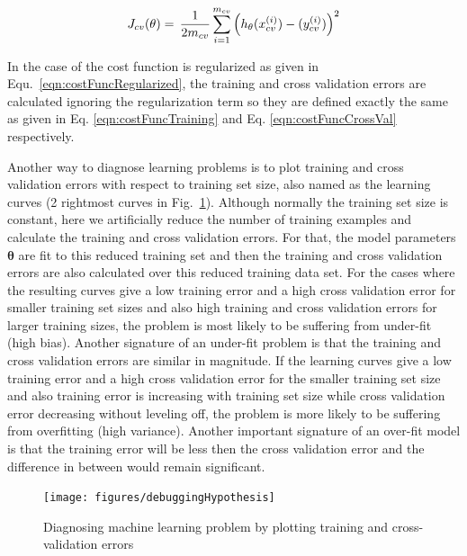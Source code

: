 \begin{equation}{\label{eqn:crossvalError}}
J_{cv}(\theta)
=\,
\frac{1}{2m_{cv}} \sum\limits_{i=1}^{m_{cv}} \Big(h_\theta(x_{cv}^{(i)}) - (y_{cv}^{(i)})\Big)^2  
\end{equation} 
\fi

In the case of the cost function is regularized as given in Equ.~\ref{eqn:costFuncRegularized}, the training and cross validation errors are calculated ignoring the regularization term so they are defined exactly the same as given in Eq. \ref{eqn:costFuncTraining} and Eq. \ref{eqn:costFuncCrossVal} respectively.


Another way to diagnose learning problems is to plot training and cross validation errors with respect to training set size, also named as the learning curves (2 rightmost curves in Fig.~\ref{fig:debuggingHypothesis}). 
Although normally the training set size is constant, here we artificially reduce the number of training examples and calculate the training and cross validation errors. 
For that, the model parameters $\bm{\theta}$ are fit to this reduced training set and then the training and cross validation errors are also calculated over this reduced training data set. 
For the cases where the resulting curves give a low training error and a high cross validation error for smaller training set sizes and also high training and cross validation errors for larger training sizes, the problem is most likely to be suffering from under-fit (high bias). 
Another signature of an under-fit problem is that the training and cross validation errors are similar in magnitude. 
If the learning curves give a low training error and a high cross validation error for the smaller training set size and also training error is increasing with training set size while cross validation error decreasing without leveling off, the problem is more likely to be suffering from overfitting (high variance). 
Another important signature of an over-fit model is that the training error will be less then the cross validation error and the difference in between would remain significant. 

\begin{landscape}
\begin{figure}
\begin{center}
\texttt{[image: figures/debuggingHypothesis]}    %
\caption{Diagnosing machine learning problem by plotting training and cross-validation errors} 
\label{fig:debuggingHypothesis}
\end{center}
\end{figure}
\end{landscape}

